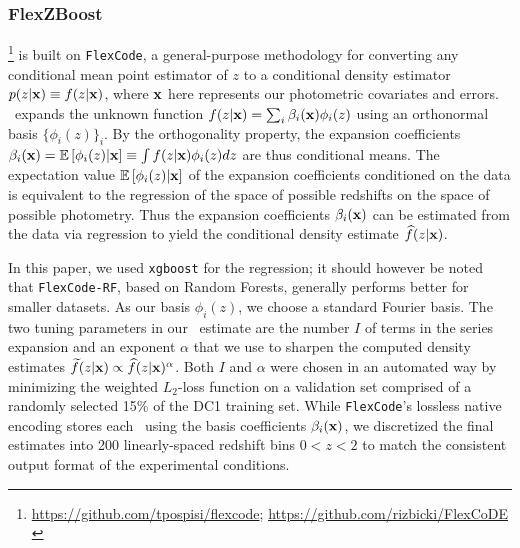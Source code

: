 \subsubsection{FlexZBoost}
\label{sec:flexzboost}

\flexzboost \footnote{\url{https://github.com/tpospisi/flexcode};  \url{https://github.com/rizbicki/FlexCoDE} \label{flexzboost_github}} \citep{Izbicki:17} is built on \texttt{FlexCode}, a general-purpose methodology for converting any conditional mean point estimator of $z$ to a conditional density estimator $p(z \vert {\mathbf{x}}) \equiv f(z \vert {\mathbf{x}})$, where ${\mathbf{x}}$ here represents our photometric covariates and errors.
\flexzboost\ expands the unknown function $f(z \vert {\mathbf{x}}) = \sum_{i}\beta_{i}({\mathbf{x}})\phi_{i}(z)$ using an orthonormal basis $\{\phi_{i}(z)\}_{i}$.
By the orthogonality property, the expansion coefficients $\beta_{i}({\mathbf{x}}) = \mathbb{E}\left[\phi_i(z)|{\mathbf{x}}\right] \equiv \int f(z \vert {\mathbf{x}}) \phi_{i}(z) dz$ are thus conditional means.
The expectation value $\mathbb{E}\left[\phi_i(z) \vert {\mathbf{x}}\right]$ of the expansion coefficients conditioned on the data is equivalent to the regression of the space of possible redshifts on the space of possible photometry.
Thus the expansion coefficients $\beta_{i}({\mathbf{x}})$ can be estimated from the data via regression to yield the conditional density estimate $\widehat{f}(z \vert {\mathbf{x}})$.

In this paper, we used \texttt{xgboost} \citep{Chen:16} for the regression; it should however be noted that \texttt{FlexCode-RF}, based on Random Forests, generally performs better for smaller datasets.
As our basis $\phi_{i}(z)$, we choose a standard Fourier basis.
The two tuning parameters in our \pzpdf\ estimate are the number $I$ of terms in the series expansion and an exponent $\alpha$ that we use to sharpen the computed density estimates $\widetilde{f}(z \vert {\mathbf{x}}) \propto \widehat{f}(z \vert {\mathbf{x}})^{\alpha}$.
Both $I$ and $\alpha$ were chosen in an automated way by minimizing the weighted $L_2$-loss function \citep[Eq. 5 in][]{Izbicki:17} on a validation set comprised of a randomly selected 15\% of the DC1 training set.
While \texttt{FlexCode}'s lossless native encoding stores each \pzpdf\ using the basis coefficients $\beta_{i}({\mathbf{x}})$, we discretized the final estimates into 200 linearly-spaced redshift bins $0 < z < 2$ to match the consistent output format of the experimental conditions.

%
%

